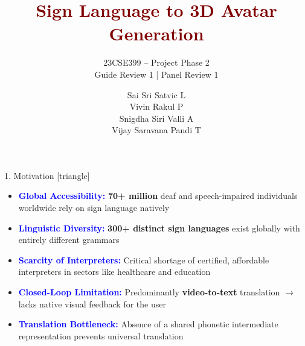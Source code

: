 \documentclass[aspectratio=169]{beamer}
\title{
    \textcolor{maroon}{\textbf{Sign Language to 3D Avatar Generation}}
}
\subtitle{
    23CSE399 -- Project Phase 2\\
    Guide Review 1 | Panel Review 1
}
\author{
    Sai Sri Satvic L \\
    Vivin Rakul P \\
    Snigdha Siri Valli A \\
    Vijay Saravana Pandi T
}
\institute{
    \normalsize
    \textbf{Guide: Ms. Nalinadevi K}\\[1mm]
    Department of CSE, Amrita Vishwa Vidyapeetham
}
\date{}
\begin{document}
\begin{frame}[plain]
\vspace*{-0.2cm}
\begin{flushright}
\end{flushright}
\vspace{-1.2cm}
\titlepage
\end{frame}

\begin{frame}{1. Motivation}
\small
{}[triangle]

\begin{itemize}
\setlength{\itemsep}{0.15cm}

\item \textcolor{blue}{\textbf{Global Accessibility:}} \textbf{70+ million} deaf and speech-impaired individuals worldwide rely on sign language natively 

\item \textcolor{blue}{\textbf{Linguistic Diversity:}} \textbf{300+ distinct sign languages} exist globally with entirely different grammars

\item \textcolor{blue}{\textbf{Scarcity of Interpreters:}} Critical shortage of certified, affordable interpreters in sectors like healthcare and education

\item \textcolor{blue}{\textbf{Closed-Loop Limitation:}} Predominantly \textbf{video-to-text} translation $\rightarrow$ lacks native visual feedback for the user

\item \textcolor{blue}{\textbf{Translation Bottleneck:}} Absence of a shared phonetic intermediate representation prevents universal translation

\end{itemize}
\end{frame}
\end{document}
